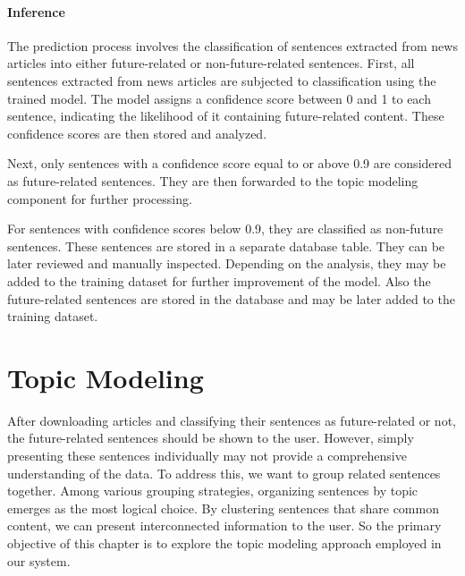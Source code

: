 \documentclass[a4paper,10pt]{report}
\begin{document}
\subsubsection{Inference}
The prediction process involves the classification of sentences extracted from news articles into either future-related or non-future-related sentences.
First, all sentences extracted from news articles are subjected to classification using the trained model. The model assigns a confidence score between 0 and 1 to each sentence, indicating the likelihood of it containing future-related content. These confidence scores are then stored and analyzed.

Next, only sentences with a confidence score equal to or above 0.9 are considered as future-related sentences. They are then forwarded to the topic modeling component for further processing.

For sentences with confidence scores below 0.9, they are classified as non-future sentences. These sentences are stored in a separate database table. They can be later reviewed and manually inspected. Depending on the analysis, they may be added to the training dataset for further improvement of the model.
Also the future-related sentences are stored in the database and may be later added to the training dataset.


\chapter{Topic Modeling}
After downloading articles and classifying their sentences as future-related or not, the future-related sentences should be shown to the user. However, simply presenting these sentences individually may not provide a comprehensive understanding of the data. To address this, we want to group related sentences together. Among various grouping strategies, organizing sentences by topic emerges as the most logical choice. By clustering sentences that share common content, we can present interconnected information to the user.
So the primary objective of this chapter is to explore the topic modeling approach employed in our system.
\end{document}
